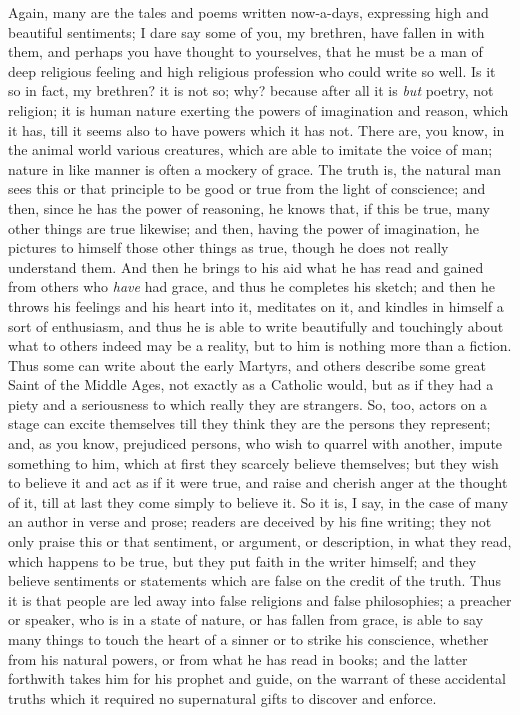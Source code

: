Again, many are the tales and poems written now-a-days, expressing
high and beautiful sentiments; I dare say some of you, my brethren,
have fallen in with them, and perhaps you have thought to yourselves,
that he must be a man of deep religious feeling and high religious
profession who could write so well. Is it so in fact, my brethren? it
is not so; why? because after all it is \emph{but} poetry, not
religion; it is human nature exerting the powers of imagination and
reason, which it has, till it seems also to have powers which it has
not. There are, you know, in the animal world various creatures, which
are able to imitate the voice of man; nature in like manner is often a
mockery of grace. The truth is, the natural man sees this or that
principle to be good or true from the light of conscience; and then,
since he has the power of reasoning, he knows that, if this be true,
many other things are true likewise; and then, having the power of
imagination, he pictures to himself those other things as true, though
he does not really understand them. And then he brings to his aid what
he has read and gained from others who \emph{have} had grace, and thus
he completes his sketch; and then he throws his feelings and his heart
into it, meditates on it, and kindles in himself a sort of enthusiasm,
and thus he is able to write beautifully and touchingly about what to
others indeed may be a reality, but to him is nothing more than a
fiction. Thus some can write about the early Martyrs, and others
describe some great Saint of the Middle Ages, not exactly as a
Catholic would, but as if they had a piety and a seriousness to which
really they are strangers. So, too, actors on a stage can excite
themselves till they think they are the persons they represent; and,
as you know, prejudiced persons, who wish to quarrel with another,
impute something to him, which at first they scarcely believe
themselves; but they wish to believe it and act as if it were true,
and raise and cherish anger at the thought of it, till at last they
come simply to believe it. So it is, I say, in the case of many an
author in verse and prose; readers are deceived by his fine writing;
they not only praise this or that sentiment, or argument, or
description, in what they read, which happens to be true, but they put
faith in the writer himself; and they believe sentiments or statements
which are false on the credit of the truth. Thus it is that people are
led away into false religions and false philosophies; a preacher or
speaker, who is in a state of nature, or has fallen from grace, is
able to say many things to touch the heart of a sinner or to strike
his conscience, whether from his natural powers, or from what he has
read in books; and the latter forthwith takes him for his prophet and
guide, on the warrant of these accidental truths which it required no
supernatural gifts to discover and enforce.

